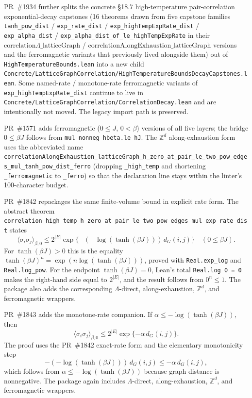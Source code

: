\documentclass[a4paper,11pt]{article}
\begin{document}
PR~\#1934 further splits the concrete §18.7 high-temperature
pair-correlation exponential-decay capstones (16 theorems drawn from five
capstone families \texttt{tanh\_pow\_dist} / \texttt{exp\_rate\_dist} /
\texttt{exp\_highTempExpRate\_dist} / \texttt{exp\_alpha\_dist} /
\texttt{exp\_alpha\_dist\_of\_le\_highTempExpRate} in their
$\mathrm{correlation}\Lambda\_\mathrm{latticeGraph}$ /
$\mathrm{correlationAlongExhaustion}\_\mathrm{latticeGraph}$ versions and
the ferromagnetic variants that previously lived alongside them) out of
\texttt{HighTemperatureBounds.lean} into a new child
\texttt{Concrete/LatticeGraphCorrelation/HighTemperatureBoundsDecayCapstones.lean}.
Some named-rate / monotone-rate ferromagnetic variants of
\texttt{exp\_highTempExpRate\_dist} continue to live in
\texttt{Concrete/LatticeGraphCorrelation/CorrelationDecay.lean} and are
intentionally not moved. The legacy import path is preserved.

PR~\#1571 adds ferromagnetic ($0 \le J,\, 0 < \beta$) versions of
all five layers; the bridge $0 \le \beta J$ follows from
\texttt{mul\_nonneg hbeta.le hJ}. The $\mathbb{Z}^d$ along-exhaustion form
uses the abbreviated name
\texttt{correlationAlongExhaustion\_latticeGraph\_h\_zero\_at\_pair\_le\_two\_pow\_edges\_mul\_tanh\_pow\_dist\_ferro}
(dropping \texttt{\_high\_temp} and shortening
\texttt{\_ferromagnetic} to \texttt{\_ferro}) so that the
declaration line stays within the linter's 100-character budget.

PR~\#1842 repackages the same finite-volume bound in explicit
rate form.  The abstract theorem
\texttt{correlation\_high\_temp\_h\_zero\_at\_pair\_le\_two\_pow\_edges\_mul\_exp\_rate\_dist}
states
\[
\langle \sigma_i \sigma_j \rangle_{\beta,0}
  \le 2^{|E|}
      \exp\{-(-\log(\tanh(\beta J)))\,d_G(i,j)\}
\quad (0 \le \beta J).
\]
For $\tanh(\beta J)>0$ this is the equality
\(\tanh(\beta J)^n =
\exp(n\log(\tanh(\beta J)))\), proved with
\texttt{Real.exp\_log} and \texttt{Real.log\_pow}.  For the endpoint
\(\tanh(\beta J)=0\), Lean's total \texttt{Real.log 0 = 0} makes the
right-hand side equal to \(2^{|E|}\), and the result follows from
\(0^n \le 1\).  The package also adds the corresponding
\(\Lambda\)-direct, along-exhaustion, \(\mathbb{Z}^d\), and
ferromagnetic wrappers.

PR~\#1843 adds the monotone-rate companion.  If
\(\alpha \le -\log(\tanh(\beta J))\), then
\[
\langle \sigma_i \sigma_j \rangle_{\beta,0}
  \le 2^{|E|}\exp\{-\alpha\,d_G(i,j)\}.
\]
The proof uses the PR~\#1842 exact-rate form and the elementary
monotonicity step
\[
  -(-\log(\tanh(\beta J)))\,d_G(i,j)
    \le -\alpha\,d_G(i,j),
\]
which follows from \(\alpha \le -\log(\tanh(\beta J))\) because graph
distance is nonnegative.  The package again includes
\(\Lambda\)-direct, along-exhaustion, \(\mathbb{Z}^d\), and
ferromagnetic wrappers.
\end{document}
